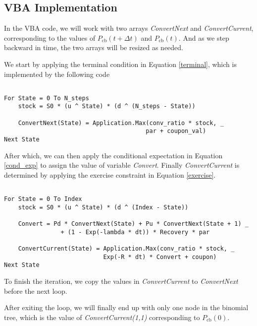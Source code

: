\documentclass[11pt]{article}
\theoremstyle{definition}
\begin{document}
\subsection{VBA Implementation} \label{ssc:vba}

In the VBA code, we will work with two arrays \emph{ConvertNext}
and \emph{ConvertCurrent}, 
corresponding to the values of $P_\text{cb}(t+\Delta t)$
and $P_\text{cb}(t)$.
And as we step backward in time, the two arrays will be resized as needed.

We start by applying the terminal condition in Equation \eqref{terminal},
which is implemented by the following code

\begin{lstlisting}[language = VBScript, caption = VBA Code for Terminal Condition]

For State = 0 To N_steps
    stock = S0 * (u ^ State) * (d ^ (N_steps - State))

    ConvertNext(State) = Application.Max(conv_ratio * stock, _
                                        par + coupon_val)
Next State

\end{lstlisting}

After which, we can then apply the conditional expectation 
in Equation \eqref{cond_exp} 
to assign the value of variable \emph{Convert}.
Finally \emph{ConvertCurrent} is determined
by applying the exercise constraint in Equation \ref{exercise}.

\begin{lstlisting}[language = VBScript, caption = VBA Code for Terminal Condition]

For State = 0 To Index
    stock = S0 * (u ^ State) * (d ^ (Index - State))

    Convert = Pd * ConvertNext(State) + Pu * ConvertNext(State + 1) _
                + (1 - Exp(-lambda * dt)) * Recovery * par

    ConvertCurrent(State) = Application.Max(conv_ratio * stock, _
                            Exp(-R * dt) * Convert + coupon)
Next State

\end{lstlisting}

To finish the iteration, we copy the values in 
\emph{ConvertCurrent} to \emph{ConvertNext} 
before the next loop.

After exiting the loop,
we will finally end up with only one node in the 
binomial tree,
which is the value of \emph{ConvertCurrent(1,1)}
corresponding to $P_\text{cb}(0)$.
\end{document}
